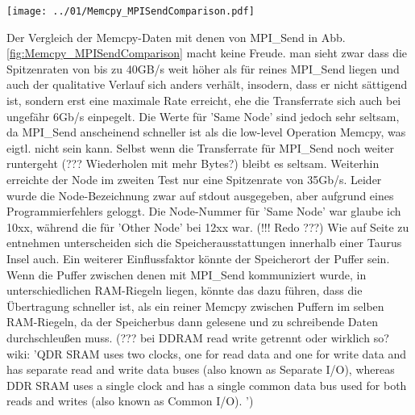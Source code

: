 \documentclass[12pt,a4paper]{article}
\begin{document}
\begin{center}
	\centering
	\captionsetup{type=figure}
	\begin{minipage}{\linewidth}
		\texttt{[image: ../01/Memcpy\_MPISendComparison.pdf]}
	\end{minipage}
	\label{fig:Memcpy_MPISendComparison}
\end{center}

Der Vergleich der Memcpy-Daten mit denen von MPI\_Send in Abb.\ref{fig:Memcpy_MPISendComparison} macht keine Freude. man sieht zwar dass die Spitzenraten von bis zu 40GB/s weit höher als für reines MPI\_Send liegen und auch der qualitative Verlauf sich anders verhält, insodern, dass er nicht sättigend ist, sondern erst eine maximale Rate erreicht, ehe die Transferrate sich auch bei ungefähr 6Gb/s einpegelt. Die Werte für 'Same Node' sind jedoch sehr seltsam, da MPI\_Send anscheinend schneller ist als die low-level Operation Memcpy, was eigtl. nicht sein kann. Selbst wenn die Transferrate für MPI\_Send noch weiter runtergeht (??? Wiederholen mit mehr Bytes?) bleibt es seltsam. Weiterhin erreichte der Node im zweiten Test nur eine Spitzenrate von 35Gb/s. Leider wurde die Node-Bezeichnung zwar auf stdout ausgegeben, aber aufgrund eines Programmierfehlers geloggt. Die Node-Nummer für 'Same Node' war glaube ich 10xx, während die für 'Other Node' bei 12xx war. (!!! Redo ???) Wie auf Seite \pageref{pg:hardwarespecs} zu entnehmen unterscheiden sich die Speicherausstattungen innerhalb einer Taurus Insel auch. Ein weiterer Einflussfaktor könnte der Speicherort der Puffer sein. Wenn die Puffer zwischen denen mit MPI\_Send kommuniziert wurde, in unterschiedlichen RAM-Riegeln liegen, könnte das dazu führen, dass die Übertragung schneller ist, als ein reiner Memcpy zwischen Puffern im selben RAM-Riegeln, da der Speicherbus dann gelesene und zu schreibende Daten durchschleußen muss. (??? bei DDRAM read write getrennt oder wirklich so? wiki: 'QDR SRAM uses two clocks, one for read data and one for write data and has separate read and write data buses (also known as Separate I/O), whereas DDR SRAM uses a single clock and has a single common data bus used for both reads and writes (also known as Common I/O). ')\\

\end{document}

